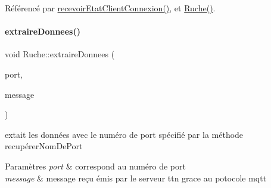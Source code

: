 Référencé par \hyperlink{class_ruche_a1224416341dc2b33418dd296327ae410}{recevoir\+Etat\+Client\+Connexion()}, et \hyperlink{class_ruche_a8b4ee3752d984c5acee93b990db7939a}{Ruche()}.

\mbox{\label{class_ruche_a21c0dafeaec03d451590037343e6a3ca}} 
\paragraph{\texorpdfstring{extraire\+Donnees()}{extraireDonnees()}}
{\footnotesize\ttfamily void Ruche\+::extraire\+Donnees (\begin{DoxyParamCaption}\item[{\hyperlink{parametres_8h_a0fe68caa1e9147addc96657cc822b937}{Ports\+T\+TN}}]{port,  }\item[{Q\+Byte\+Array}]{message }\end{DoxyParamCaption})\hspace{0.3cm}{\ttfamily [private]}}

extait les données avec le numéro de port spécifié par la méthode recupérer\+Nom\+De\+Port 
\begin{DoxyParams}{Paramètres}
{\em port} & correspond au numéro de port \\
\hline
{\em message} & message reçu émis par le serveur ttn grace au potocole mqtt \\
\hline
\end{DoxyParams}


